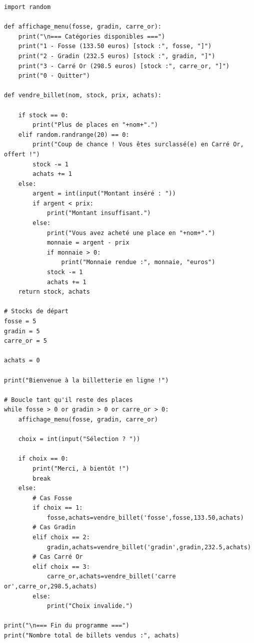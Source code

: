 \begin{verbatim}
import random

def affichage_menu(fosse, gradin, carre_or):
    print("\n=== Catégories disponibles ===")
    print("1 - Fosse (133.50 euros) [stock :", fosse, "]")
    print("2 - Gradin (232.5 euros) [stock :", gradin, "]")
    print("3 - Carré Or (298.5 euros) [stock :", carre_or, "]")
    print("0 - Quitter")

def vendre_billet(nom, stock, prix, achats):

    if stock == 0:
        print("Plus de places en "+nom+".")
    elif random.randrange(20) == 0:
        print("Coup de chance ! Vous êtes surclassé(e) en Carré Or, offert !")
        stock -= 1
        achats += 1
    else:
        argent = int(input("Montant inséré : "))
        if argent < prix:
            print("Montant insuffisant.")
        else:
            print("Vous avez acheté une place en "+nom+".")
            monnaie = argent - prix
            if monnaie > 0:
                print("Monnaie rendue :", monnaie, "euros")
            stock -= 1
            achats += 1
    return stock, achats

# Stocks de départ
fosse = 5
gradin = 5
carre_or = 5

achats = 0

print("Bienvenue à la billetterie en ligne !")

# Boucle tant qu'il reste des places
while fosse > 0 or gradin > 0 or carre_or > 0:
    affichage_menu(fosse, gradin, carre_or)

    choix = int(input("Sélection ? "))

    if choix == 0:
        print("Merci, à bientôt !")
        break
    else:
        # Cas Fosse
        if choix == 1:
            fosse,achats=vendre_billet('fosse',fosse,133.50,achats)
        # Cas Gradin
        elif choix == 2:
            gradin,achats=vendre_billet('gradin',gradin,232.5,achats)
        # Cas Carré Or
        elif choix == 3:
            carre_or,achats=vendre_billet('carre or',carre_or,298.5,achats)
        else:
            print("Choix invalide.")

print("\n=== Fin du programme ===")
print("Nombre total de billets vendus :", achats)
\end{verbatim}


